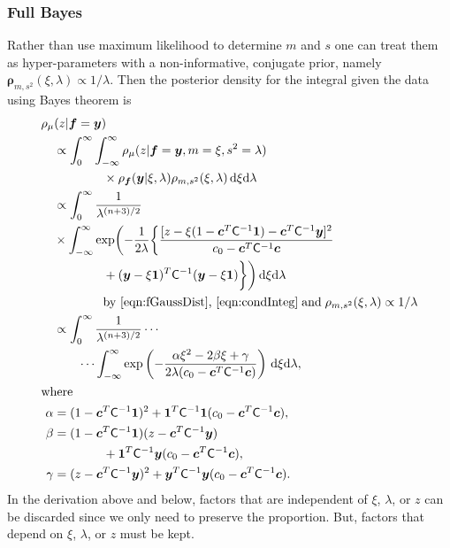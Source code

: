 \documentclass[twocolumn]{svjour3}          %
\newcommand{\bm}[1]{\boldsymbol{#1}}
\newcommand{\D}[1]{\text{d}{#1}}
\newcommand{\vc}{\bm{c}}
\newcommand{\vf}{\bm{f}}
\newcommand{\vrho}{\bm{\rho}}
\newcommand{\vy}{\bm{y}}
\newcommand{\vone}{\bm{1}}
\newcommand{\mC}{\mathsf{C}}
\begin{document}
\subsubsection{Full Bayes}

Rather than use maximum likelihood to determine $m$ and $s$ one can treat them as hyper-parameters with a non-informative, conjugate prior, namely $\vrho_{m,s^2}(\xi, \lambda) \propto 1/\lambda$. Then the posterior density for the integral given the data using Bayes theorem is
\begin{align*}
\MoveEqLeft[1]{\rho_{\mu}(z | \vf = \vy)} \\
& \propto \int_{0}^\infty \int_{-\infty}^\infty \rho_{\mu}(z | \vf = \vy, m = \xi, s^2 = \lambda) \\
& \qquad \qquad \times  \rho_{\vf}(\vy | \xi, \lambda ) \rho_{m, s^2}(\xi, \lambda) \, \D \xi \D \lambda \\
& \propto \displaystyle \int_{0}^\infty  \frac{1}{\lambda^{(n+3)/2}} \\
& \times \int_{-\infty}^\infty  \exp \biggl( -\frac{1}{2\lambda}\biggl\{
\frac{
[z - \xi (1 - \vc^T \mC^{-1} \vone)  -  \vc^T \mC^{-1} \vy]^2}
{c_0  -\vc ^T \mC^{-1} \vc}  \\
& \qquad \qquad  + (\vy - \xi \vone)^T \mC^{-1}(\vy - \xi \vone) \biggr \} \biggr) \, \D \xi \D \lambda \\
&\qquad \qquad
\text{by \eqref{eqn:fGaussDist}, \eqref{eqn:condInteg}} \; \text{and} \; \rho_{m,s^2}(\xi,\lambda) \propto 1/\lambda \\
& \propto \displaystyle \int_{0}^\infty  \frac{1}{\lambda^{(n+3)/2}} \cdots \\ & \qquad \cdots \int_{-\infty}^\infty  \exp\left( -\frac{\alpha \xi^2 -2 \beta \xi + \gamma}{2\lambda(c_0  -\vc ^T \mC^{-1} \vc)} \right) \, \D \xi \D \lambda, \\
\intertext{where}
\alpha & = (1 - \vc^T \mC^{-1} \vone)^2 + \vone^T \mC^{-1} \vone (c_0  -\vc ^T \mC^{-1} \vc),\\
\beta & =(1 - \vc^T \mC^{-1} \vone)(z - \vc^T \mC^{-1} \vy ) \\
& \qquad \qquad  + \vone^T \mC^{-1} \vy (c_0  -\vc ^T \mC^{-1} \vc),\\
\gamma &  = (z - \vc^T \mC^{-1} \vy )^2  + \vy^T \mC^{-1} \vy (c_0  -\vc ^T \mC^{-1} \vc).
\end{align*}
In the derivation above and below, factors that are independent of $\xi$, $\lambda$, or $z$ can be discarded since we only need to preserve the proportion.  But, factors that depend on $\xi$, $\lambda$, or $z$ must be kept.  
\end{document}
